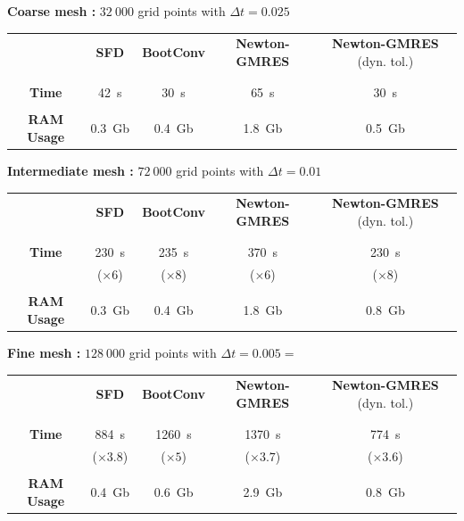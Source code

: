 \documentclass[aspectratio=169, usenames, dvipsnames]{beamer}
\begin{document}
{\begin{frame}
  \vfill
  \centering
  \textbf{Coarse mesh :} $32\ 000$ grid points with $\Delta t = 0.025$

  \vfill
  
  \begin{tabular}{ccccc}
    ~ & \textbf{SFD} & \textbf{BootConv} & \textbf{Newton-GMRES} & \textbf{Newton-GMRES} (dyn. tol.) \\
    \\
    \hline \\
    \textbf{Time} & 42~\unit{\s} & 30~\unit{\s} & 65~\unit{\s} & 30~\unit{\s}\\
    \\
    \textbf{RAM Usage} & 0.3~\unit{Gb} & 0.4~\unit{Gb} & 1.8~\unit{Gb} & 0.5~\unit{Gb} 
  \end{tabular}
  \vfill
\end{frame}


\begin{frame}
  \vfill
  \centering
  \textbf{Intermediate mesh :} $72\ 000$ grid points with $\Delta t = 0.01$

  \vfill
  
  \begin{tabular}{ccccc}
    ~ & \textbf{SFD} & \textbf{BootConv} & \textbf{Newton-GMRES} & \textbf{Newton-GMRES} (dyn. tol.) \\
    \\
    \hline \\
    \textbf{Time} & 230~\unit{\s} & 235~\unit{\s} & 370~\unit{\s} & 230~\unit{\s}\\
      & ($\times 6$) & ($\times 8$) & ($\times 6$) & ($\times 8$) \\
    \\
    \textbf{RAM Usage} & 0.3~\unit{Gb} & 0.4~\unit{Gb} & 1.8~\unit{Gb} & 0.8~\unit{Gb} 
  \end{tabular}
  \vfill
\end{frame}


\begin{frame}
  \vfill
  \centering
  \textbf{Fine mesh :} $128\ 000$ grid points with $\Delta t = 0.005=$

  \vfill
  
  \begin{tabular}{ccccc}
    ~ & \textbf{SFD} & \textbf{BootConv} & \textbf{Newton-GMRES} & \textbf{Newton-GMRES} (dyn. tol.) \\
    \\
    \hline \\
    \textbf{Time} & 884~\unit{\s} & 1260~\unit{\s} & 1370~\unit{\s} & 774~\unit{\s}\\
      & ($\times 3.8$) & ($\times 5$) & ($\times 3.7$) & ($\times 3.6$) \\
    \\
    \textbf{RAM Usage} & 0.4~\unit{Gb} & 0.6~\unit{Gb} & 2.9~\unit{Gb} & 0.8~\unit{Gb} 
  \end{tabular}
  \vfill
\end{frame}


}
\end{document}
